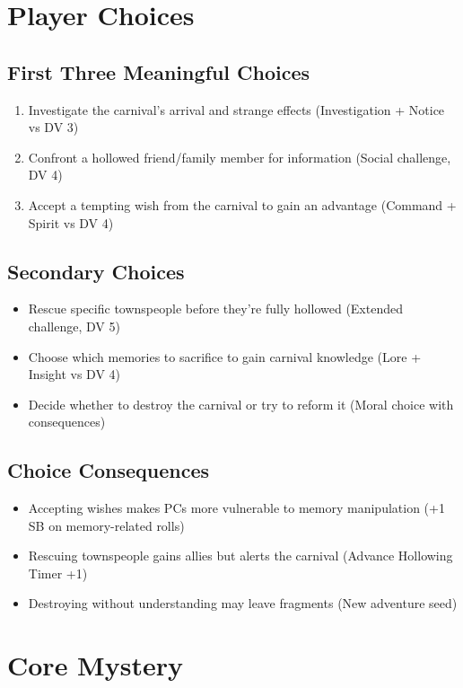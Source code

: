 \documentclass[11pt]{article}
\begin{document}
\section{Player Choices}

\subsection{First Three Meaningful Choices}
\begin{enumerate}
\item Investigate the carnival's arrival and strange effects (Investigation + Notice vs DV 3)
\item Confront a hollowed friend/family member for information (Social challenge, DV 4)
\item Accept a tempting wish from the carnival to gain an advantage (Command + Spirit vs DV 4)
\end{enumerate}

\subsection{Secondary Choices}
\begin{itemize}
\item Rescue specific townspeople before they're fully hollowed (Extended challenge, DV 5)
\item Choose which memories to sacrifice to gain carnival knowledge (Lore + Insight vs DV 4)
\item Decide whether to destroy the carnival or try to reform it (Moral choice with consequences)
\end{itemize}

\subsection{Choice Consequences}
\begin{itemize}
\item Accepting wishes makes PCs more vulnerable to memory manipulation (+1 SB on memory-related rolls)
\item Rescuing townspeople gains allies but alerts the carnival (Advance Hollowing Timer +1)
\item Destroying without understanding may leave fragments (New adventure seed)
\end{itemize}

\section{Core Mystery}
\end{document}
